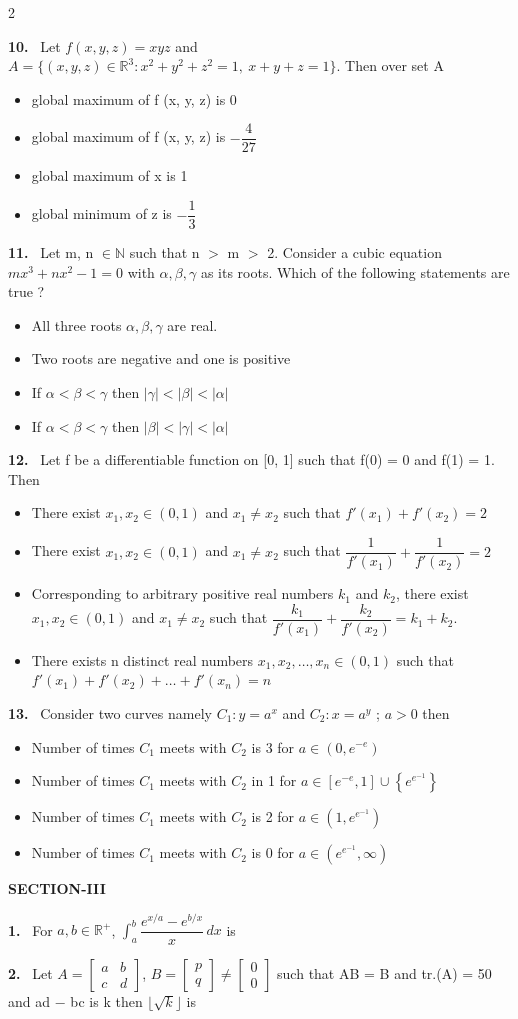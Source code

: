 \documentclass[10pt]{extarticle}
\newcommand{\sect}[1]{\par\smallskip\noindent\textbf{#1}\par}
\newcommand{\qn}[1]{\par\smallskip\noindent\textbf{#1.}~}
\newenvironment{qoptions}{\begin{itemize}[leftmargin=1.8em,itemsep=1pt,topsep=2pt,label={}]}{\end{itemize}}
\newcommand{\opt}[2]{\item[(#1)] #2}
\begin{document}
\begin{multicols}{2}
\qn{10} Let $f(x,y,z)=xyz$ and $A=\{(x,y,z)\in\mathbb R^3:x^2+y^2+z^2=1,\ x+y+z=1\}$. Then over set A
\begin{qoptions}
\opt{A}{global maximum of f (x, y, z) is 0}
\opt{B}{global maximum of f (x, y, z) is $-\dfrac4{27}$}
\opt{C}{global maximum of x is 1}
\opt{D}{global minimum of z is $-\dfrac13$}
\end{qoptions}
\qn{11} Let m, n $\in\mathbb N$ such that n $>$ m $>$ 2. Consider a cubic equation $mx^3+nx^2-1=0$ with $\alpha,\beta,\gamma$ as its roots. Which of the following statements are true ?
\begin{qoptions}
\opt{A}{All three roots $\alpha,\beta,\gamma$ are real.}
\opt{B}{Two roots are negative and one is positive}
\opt{C}{If $\alpha<\beta<\gamma$ then $|\gamma|<|\beta|<|\alpha|$}
\opt{D}{If $\alpha<\beta<\gamma$ then $|\beta|<|\gamma|<|\alpha|$}
\end{qoptions}
\qn{12} Let f be a differentiable function on [0, 1] such that f(0) = 0 and f(1) = 1. Then
\begin{qoptions}
\opt{A}{There exist $x_1,x_2\in(0,1)$ and $x_1\ne x_2$ such that $f'(x_1)+f'(x_2)=2$}
\opt{B}{There exist $x_1,x_2\in(0,1)$ and $x_1\ne x_2$ such that $\dfrac1{f'(x_1)}+\dfrac1{f'(x_2)}=2$}
\opt{C}{Corresponding to arbitrary positive real numbers $k_1$ and $k_2$, there exist $x_1,x_2\in(0,1)$ and $x_1\ne x_2$ such that $\dfrac{k_1}{f'(x_1)}+\dfrac{k_2}{f'(x_2)}=k_1+k_2$.}
\opt{D}{There exists n distinct real numbers $x_1,x_2,\dots,x_n\in(0,1)$ such that $f'(x_1)+f'(x_2)+\dots+f'(x_n)=n$}
\end{qoptions}
\qn{13} Consider two curves namely $C_1: y=a^x$ and $C_2: x=a^y$ ; $a>0$ then
\begin{qoptions}
\opt{A}{Number of times $C_1$ meets with $C_2$ is 3 for $a\in(0,e^{-e})$}
\opt{B}{Number of times $C_1$ meets with $C_2$ in 1 for $a\in\left[e^{-e},1\right]\cup\left\{e^{e^{-1}}\right\}$}
\opt{C}{Number of times $C_1$ meets with $C_2$ is 2 for $a\in\left(1,e^{e^{-1}}\right)$}
\opt{D}{Number of times $C_1$ meets with $C_2$ is 0 for $a\in\left(e^{e^{-1}},\infty\right)$}
\end{qoptions}
\sect{SECTION-III}
\qn{1} For $a,b\in\mathbb R^{+}$, $\displaystyle\int_a^b\dfrac{e^{x/a}-e^{b/x}}{x}\,dx$ is
\qn{2} Let $A=\begin{bmatrix}a&b\\c&d\end{bmatrix}$, $B=\begin{bmatrix}p\\q\end{bmatrix}\neq\begin{bmatrix}0\\0\end{bmatrix}$ such that AB = B and tr.(A) = 50 and ad $-$ bc is k then $\lfloor\sqrt k\rfloor$ is

\end{multicols}
\end{document}
